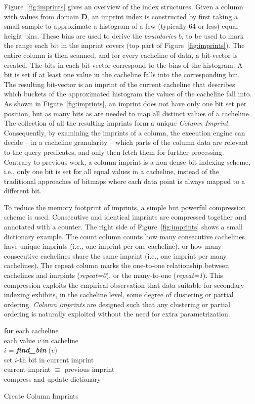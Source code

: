 \documentclass[sigconf]{acmart}
\begin{document}
Figure~\ref{fig:imprints} gives an overview of the index structures. Given a column with values from
domain $\mathbf{D}$, an imprint index is constructed by first taking a small
sample to approximate a histogram of a few (typically 64 or less) equal-height
bins. These bins are used to derive the {\em boundaries} $b_i$ to be used to mark the range
each bit in the imprint covers (top part of Figure~\ref{fig:imprints}).  The entire column is
then scanned, and for every cacheline of data, a bit-vector is created. The 
bits in each bit-vector correspond to the bins of the histogram. A bit is set if at least one value in 
the cacheline falls into the corresponding bin. The resulting bit-vector is an imprint of the
current cacheline that describes which buckets of the approximated
histogram the values of the cacheline fall into. As shown in Figure~\ref{fig:imprints}, an imprint does
not have only one bit set per position, but as many bits as are needed
to map all distinct values of a cacheline. The collection of
all the resulting imprints form a unique {\em Column Imprint}. Consequently,
by examining the imprints of a column, the execution engine 
can decide -- in a cacheline granularity -- which parts of the column
data are relevant to the query predicates, and only then fetch them
for further processing. Contrary to previous work, a column imprint is a
non-dense bit indexing scheme, i.e., only one bit is set for all equal values
in a cacheline, instead of the traditional approaches of bitmaps where each
data point is always mapped to a different bit.

To reduce the memory footprint of imprints, a simple but powerful compression scheme is used.
Consecutive and identical imprints are compressed together and annotated with a counter.
The right side of Figure~\ref{fig:imprints} shows a small dictionary example. The count
column counts how many consecutive cachelines have unique imprints
(i.e., one imprint per one cacheline), or how many consecutive cachelines share the same imprint
(i.e., one imprint per many cachelines). The repeat column marks
the one-to-one relationship between cachelines and imrpints ({\em repeat=0}), or the many-to-one
({\em repeat=1}). This compression exploits
the empirical observation that data suitable for secondary indexing
exhibits, in the cacheline level, some degree of clustering or partial
ordering. {\em Column imprints} are designed such that any clustering or partial
ordering is naturally exploited without the need for extra parametrization. 

\begin{algorithm}[t]
\begin{tabbing}
{\bf for} \=each cacheline\\
    \=each value $v$ in cacheline\\
        \>\>$i$ = \textbf{\textit{find\_bin}} ($v$)\\
        \>\>set $i$-th bit in current imprint\\
     current imprint $\equiv$ previous imprint\\
     \>\> compress and update dictionary
\end{tabbing}        
\caption{Create Column Imprints\label{algo:create}}
\end{algorithm}
\end{document}
